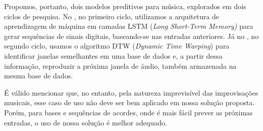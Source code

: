 Propomos, portanto, dois modelos preditivos para música, explorados em dois ciclos de pesquisa. No , no primeiro ciclo, utilizamos a arquitetura de aprendizagem de máquina em camadas LSTM (\textit{Long Short-Term Memory)} \cite{lstm} para gerar sequências de sinais digitais, baseando-se nas entradas anteriores. Já no , no segundo ciclo, usamos o algoritmo DTW (\textit{Dynamic Time Warping}) \cite{dtw} para identificar janelas semelhantes em uma base de dados e, a partir dessa informação, reproduzir a próxima janela de áudio, também armazenada na mesma base de dados.

É válido mencionar que, no entanto, pela natureza imprevisível das improvisações musicais, esse caso de uso não deve ser bem aplicado em nossa solução proposta. Porém, para bases e sequências de acordes, onde é mais fácil prever as próximas entradas, o uso de nossa solução é melhor adequado.
